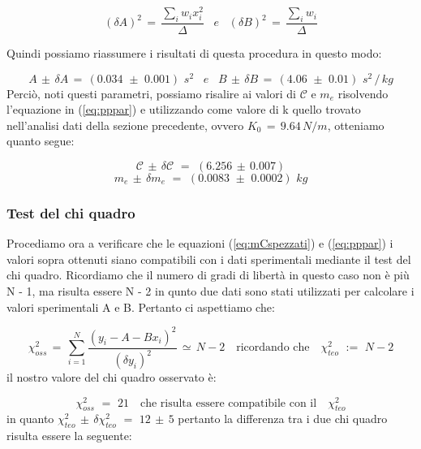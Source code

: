 \begin{itemize}
{		\begin{equation*}
			(\delta A)^2 \,=\, \frac{\sum_i w_i x_i^2}{\Delta}  \,\,\,\,\, e \,\,\,\,\,
			(\delta B)^2 \,=\, \frac{\sum_i w_i}{\Delta} 
		\end{equation*}}
\end{itemize} 
Quindi possiamo riassumere i risultati di questa procedura in questo modo:

\begin{equation*}
	A \,\pm\, \delta A \,=\, (0.034 \,\, \pm \,\, 0.001) \,\,s^2 \,\,\,\,\, e \,\,\,\,\,
	B \,\pm\, \delta B \,=\, (4.06 \,\, \pm \,\, 0.01) \,\,s^2 \,/\, kg
\end{equation*}
%
Perciò, noti questi parametri, possiamo risalire ai valori di $\mathcal{C}$ e $m_e$ risolvendo l'equazione in (\ref{eq:pppar}) e utilizzando come valore di k quello trovato nell'analisi dati della sezione precedente, ovvero $K_0 \,=\, 9.64 \, N/m$, otteniamo quanto segue:

\begin{equation*}
	\mathcal{C} \,\pm\, \delta \mathcal{C} \,\,=\,\, (6.256 \, \pm \, 0.007)
\end{equation*}
%
\begin{equation*}
	m_e \, \pm \, \delta m_e \,\,=\,\, (0.0083 \,\, \pm \,\, 0.0002) \,\, kg
\end{equation*}

\subsubsection{Test del chi quadro}
Procediamo ora a verificare che le equazioni (\ref{eq:mCspezzati}) e (\ref{eq:pppar}) i valori sopra ottenuti siano compatibili con i dati sperimentali mediante il test del chi quadro. Ricordiamo che il numero di gradi di libertà in questo caso non è più N - 1, ma risulta essere N - 2 in qunto due dati sono stati utilizzati per calcolare i  valori sperimentali A e B. Pertanto ci aspettiamo che:

\begin{equation*}
	\chi_{oss}^2 \,=\, \sum_{i=1}^{N} \frac{(y_i - A - Bx_i)^2}{(\delta y_i)^2} \,\simeq\, N - 2 \quad \text{ricordando che} \quad \chi_{teo}^2 \,\,:=\,\, N - 2
\end{equation*}
%
il nostro valore del chi quadro osservato è:

\begin{equation*}
	\chi_{oss}^2 \,\,=\,\, 21 \quad \text{che risulta essere compatibile con il} \quad \chi_{teo}^2
\end{equation*}
%
in quanto $\chi_{teo}^2 \, \pm \, \delta \chi_{teo}^2 \,\,=\,\, 12 \, \pm \, 5$ pertanto la differenza tra i due chi quadro risulta essere la seguente:


